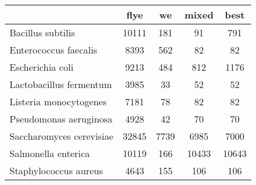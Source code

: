\begin{minipage}{0.91\textwidth}
\begin{adjustbox}{center}
\begin{tabular}{|l||c|c|c|c|}
\hline
 & flye & we & mixed & best \\
\hline
\hline
Bacillus subtilis & \cellcolor[RGB]{235, 71, 71} 10111 & \cellcolor[RGB]{237, 237, 253} 181 & \cellcolor[RGB]{232, 232, 252} 91 & \cellcolor[RGB]{252, 232, 232} 791 \\
\hline
Enterococcus faecalis & \cellcolor[RGB]{235, 71, 71} 8393 & \cellcolor[RGB]{252, 232, 232} 562 & \cellcolor[RGB]{232, 232, 252} 82 & \cellcolor[RGB]{232, 232, 252} 82 \\
\hline
Escherichia coli & \cellcolor[RGB]{235, 71, 71} 9213 & \cellcolor[RGB]{223, 223, 251} 484 & \cellcolor[RGB]{246, 246, 254} 812 & \cellcolor[RGB]{253, 241, 241} 1176 \\
\hline
Lactobacillus fermentum & \cellcolor[RGB]{235, 71, 71} 3985 & \cellcolor[RGB]{218, 218, 251} 33 & \cellcolor[RGB]{255, 255, 255} 52 & \cellcolor[RGB]{255, 255, 255} 52 \\
\hline
Listeria monocytogenes & \cellcolor[RGB]{235, 71, 71} 7181 & \cellcolor[RGB]{218, 218, 251} 78 & \cellcolor[RGB]{255, 255, 255} 82 & \cellcolor[RGB]{255, 255, 255} 82 \\
\hline
Pseudomonas aeruginosa & \cellcolor[RGB]{235, 71, 71} 4928 & \cellcolor[RGB]{218, 218, 251} 42 & \cellcolor[RGB]{255, 255, 255} 70 & \cellcolor[RGB]{255, 255, 255} 70 \\
\hline
Saccharomyces cerevisiae & \cellcolor[RGB]{235, 71, 71} 32845 & \cellcolor[RGB]{252, 232, 232} 7739 & \cellcolor[RGB]{232, 232, 252} 6985 & \cellcolor[RGB]{232, 232, 252} 7000 \\
\hline
Salmonella enterica & \cellcolor[RGB]{255, 255, 255} 10119 & \cellcolor[RGB]{218, 218, 251} 166 & \cellcolor[RGB]{255, 255, 255} 10433 & \cellcolor[RGB]{255, 255, 255} 10643 \\
\hline
Staphylococcus aureus & \cellcolor[RGB]{235, 71, 71} 4643 & \cellcolor[RGB]{252, 232, 232} 155 & \cellcolor[RGB]{232, 232, 252} 106 & \cellcolor[RGB]{232, 232, 252} 106 \\
\hline
\end{tabular}
\end{adjustbox}
\end{minipage}
